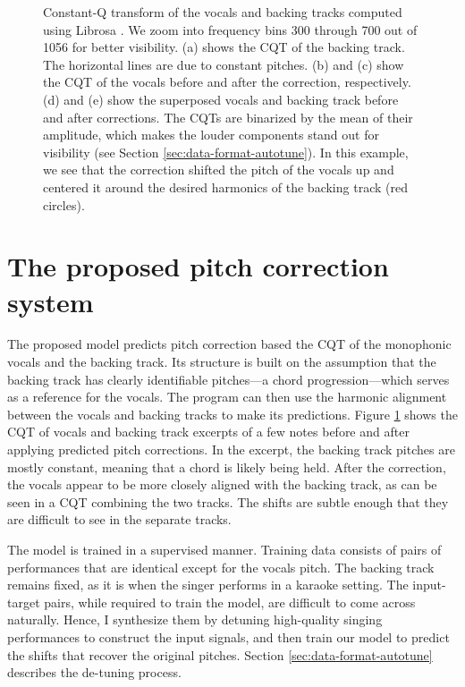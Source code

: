 \begin{figure}[t]
    \caption{
    Constant-Q transform of the vocals and backing tracks computed using Librosa \cite{mcfee2015librosa}. We zoom into frequency bins 300 through 700 out of 1056 for better visibility. (a) shows the CQT of the backing track. The horizontal lines are due to constant pitches. (b) and (c) show the CQT of the vocals before and after the correction, respectively. (d) and (e) show the superposed vocals and backing track before and after corrections. The CQTs are binarized by the mean of their amplitude, which makes the louder components stand out for visibility (see Section \ref{sec:data-format-autotune}). In this example, we see that the correction shifted the pitch of the vocals up and centered it around the desired harmonics of the backing track (red circles). 
    }
    \label{fig:model-input-autotune}
\end{figure}

\section{The proposed pitch correction system}
\label{sec:proposed-autotune}
The proposed model predicts pitch correction based the CQT of the monophonic vocals and the backing track. Its structure is built on the assumption that the backing track has clearly identifiable pitches---a chord progression---which serves as a reference for the vocals. The program can then use the harmonic alignment between the vocals and backing tracks to make its predictions. Figure \ref{fig:model-input-autotune} shows the CQT of vocals and backing track excerpts of a few notes before and after applying predicted pitch corrections. In the excerpt, the backing track pitches are mostly constant, meaning that a chord is likely being held. After the correction, the vocals appear to be more closely aligned with the backing track, as can be seen in a CQT combining the two tracks. The shifts are subtle enough that they are difficult to see in the separate tracks. 

The model is trained in a supervised manner. Training data consists of pairs of performances that are identical except for the vocals pitch. The backing track remains fixed, as it is when the singer performs in a karaoke setting. The input-target pairs, while required to train the model, are difficult to come across naturally. Hence, I synthesize them by detuning high-quality singing performances to construct the input signals, and then train our model to predict the shifts that recover the original pitches. Section \ref{sec:data-format-autotune} describes the de-tuning process.

